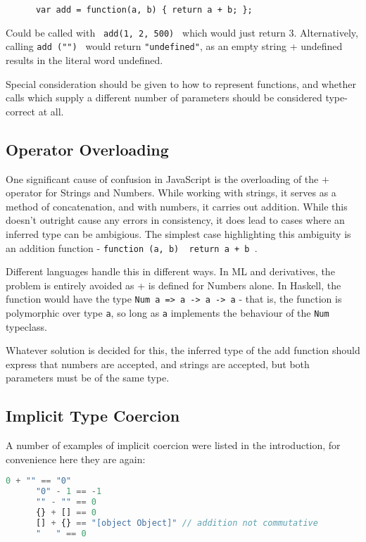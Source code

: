 \documentclass[british, twoside]{bhamthesis}
\theoremstyle{definition}
\begin{document}
    \begin{lstlisting}
      var add = function(a, b) { return a + b; };
    \end{lstlisting}

    Could be called with \texttt { add(1, 2, 500) } which would just return 3. Alternatively, calling \texttt {add ("") } would return \texttt {"undefined"}, as an empty string + undefined results in the literal word undefined.

    Special consideration should be given to how to represent functions, and whether calls which supply a different number of parameters should be considered type-correct at all.

  \subsection{Operator Overloading}
    One significant cause of confusion in JavaScript is the overloading of the $+$ operator for Strings and Numbers. While working with strings, it serves as a method of concatenation, and with numbers, it carries out addition. While this doesn't outright cause any errors in consistency, it does lead to cases where an inferred type can be ambigious. The simplest case highlighting this ambiguity is an addition function - \texttt {function (a, b) { return a + b }}.

    Different languages handle this in different ways. In ML and derivatives, the problem is entirely avoided as + is defined for Numbers alone. In Haskell, the function would have the type \texttt {Num a => a -> a -> a} - that is, the function is polymorphic over type \texttt{a}, so long as \texttt{a} implements the behaviour of the \texttt{Num} typeclass.

    Whatever solution is decided for this, the inferred type of the add function should express that numbers are accepted, and strings are accepted, but both parameters must be of the same type.

  \subsection{Implicit Type Coercion}
    A number of examples of implicit coercion were listed in the introduction, for convenience here they are again:

    \begin{lstlisting}[language=JavaScript]
      0 + "" == "0"
      "0" - 1 == -1
      "" - "" == 0
      {} + [] == 0
      [] + {} == "[object Object]" // addition not commutative
      "   " == 0
    \end{lstlisting}
\end{document}
